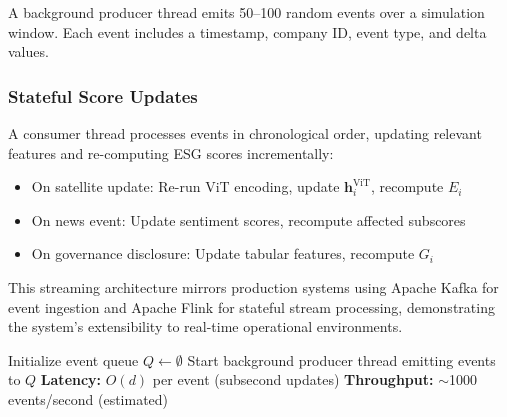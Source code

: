 A background producer thread emits 50–100 random events over a simulation window. Each event includes a timestamp, company ID, event type, and delta values.

\subsubsection{Stateful Score Updates}

A consumer thread processes events in chronological order, updating relevant features and re-computing ESG scores incrementally:
\begin{itemize}
\item On satellite update: Re-run ViT encoding, update $\mathbf{h}_i^{\text{ViT}}$, recompute $E_i$
\item On news event: Update sentiment scores, recompute affected subscores
\item On governance disclosure: Update tabular features, recompute $G_i$
\end{itemize}

This streaming architecture mirrors production systems using Apache Kafka for event ingestion and Apache Flink for stateful stream processing, demonstrating the system's extensibility to real-time operational environments.

\begin{algorithm}[H]
\caption{Real-Time ESG Score Streaming Update}
\label{alg:streaming}
\BlankLine
Initialize event queue $Q \gets \emptyset$\;
Start background producer thread emitting events to $Q$\;
\BlankLine
{}
\BlankLine
\textbf{Latency:} $O(d)$ per event (subsecond updates)\;
\textbf{Throughput:} $\sim$1000 events/second (estimated)\;
\end{algorithm}

